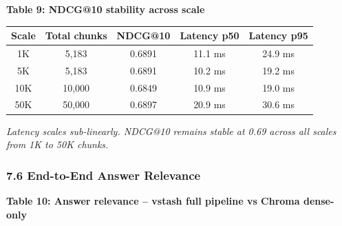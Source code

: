 \documentclass[
  11pt]{article}
\newcounter{none} %
\begin{document}
\textbf{Table 9: NDCG@10 stability across scale}

{\def\LTcaptype{none} %
\begin{longtable}[]{@{}ccccc@{}}
\toprule\noalign{}
Scale & Total chunks & NDCG@10 & Latency p50 & Latency p95 \\
\midrule\noalign{}
\endhead
\bottomrule\noalign{}
\endlastfoot
1K & 5,183 & 0.6891 & 11.1 ms & 24.9 ms \\
5K & 5,183 & 0.6891 & 10.2 ms & 19.2 ms \\
10K & 10,000 & 0.6849 & 10.9 ms & 19.0 ms \\
50K & 50,000 & 0.6897 & 20.9 ms & 30.6 ms \\
\end{longtable}
}

\emph{Latency scales sub-linearly. NDCG@10 remains stable at 0.69 across all scales from 1K to 50K chunks.}

\subsubsection{7.6 End-to-End Answer Relevance}\label{end-to-end-answer-relevance}

\textbf{Table 10: Answer relevance -- vstash full pipeline vs Chroma dense-only}
\end{document}
